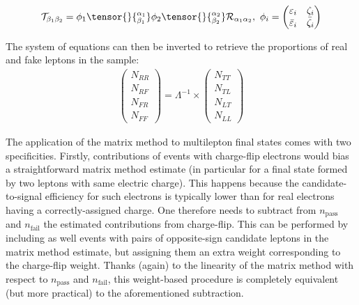 \begin{align}
\mathcal{T}_{\beta_1 \beta_2} = 
\phi_1\tensor{\vphantom{\phi}}{_{\beta_1}^{\alpha_1}} 
\phi_2\tensor{\vphantom{\phi}}{_{\beta_2}^{\alpha_2}}
\mathcal{R}_{\alpha_1 \alpha_2},~
\phi_i = 
 \begin{pmatrix}\varepsilon_i & \zeta_i\\ \bar\varepsilon_i & \bar\zeta_i\end{pmatrix}
\label{eq:fake.tensor_compact}
\end{align}


 The system of equations can then be inverted to retrieve the proportions of real and fake leptons in the sample:
\begin{align}
\left(\begin{array}{c}
N_{RR} \\  N_{RF} \\ N_{FR} \\ N_{FF}
\end{array}\right) =
\Lambda^{-1} \times 
\left(\begin{array}{c}
N_{TT} \\  N_{TL} \\ N_{LT} \\ N_{LL}
\end{array}\right)
\label{eq:mxm_inverted}
\end{align}



The application of the matrix method to multilepton final states comes with two specificities. Firstly, contributions of events with charge-flip electrons would bias a straightforward matrix method estimate (in particular for a final state formed by two leptons with same electric charge). This happens because the candidate-to-signal efficiency for such electrons is typically lower than for real electrons having a correctly-assigned charge. One therefore needs to subtract from $n_\text{pass}$ and $n_\text{fail}$ the estimated contributions from charge-flip. This can be performed by including as well events with pairs of opposite-sign candidate leptons in the matrix method estimate, but assigning them an extra weight corresponding to the charge-flip weight. Thanks (again) to the linearity of the matrix method with respect to $n_\text{pass}$ and $n_\text{fail}$, this weight-based procedure is completely equivalent (but more practical) to the aforementioned subtraction. 

